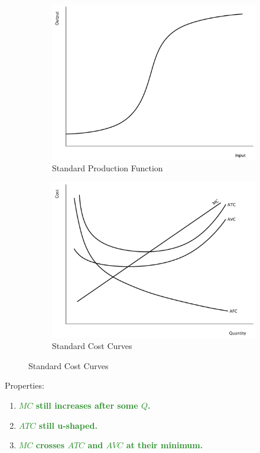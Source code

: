 \documentclass[11pt]{article}\usepackage[]{graphicx}\usepackage[]{color}
\theoremstyle{definition}
\newcommand{\ddp}[1]{{\textbf{\textcolor{ForestGreen}{#1}}}}
\begin{document}
		\begin{figure}[H]
			\centering
			\caption{Standard Curves}
			\begin{subfigure}{.5\textwidth}
				\includegraphics[scale=.3]{plot58.pdf}
				\caption{Standard Production Function}
			\end{subfigure}%
			\begin{subfigure}{.5\textwidth}
				\centering
				\includegraphics[scale=.3]{plot59.pdf}
				\caption{Standard Cost Curves}
			\end{subfigure}
		\end{figure}
	
	Properties:
	\begin{enumerate}
		\item \ddp{$MC$ still increases after some $Q$.}
		\item \ddp{$ATC$ still u-shaped.}
		\item \ddp{$MC$ crosses $ATC$ and $AVC$ at their minimum.}
	\end{enumerate}
	
\end{document}
